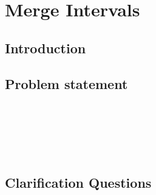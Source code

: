 %



\chapter{Merge Intervals}
\label{ch:merge_intervals_2}
\section*{Introduction}

\section{Problem statement}
\begin{exercise}
\label{example:merge_intervals_2:exercice1}

	\begin{example}
		\label{example:merge_intervals_2:example1}
		\hfill \
	}
		
	\end{example}

	\begin{example}
		\label{example:merge_intervals_2:example2}
		\hfill \
		
	\end{example}

	\begin{example}
		\hfill \
	
	\label{ex:merge_intervals_2:example3}
	\end{example}

	\begin{example}
		\hfill \

	\label{ex:merge_intervals_2:example4}	
	\end{example}
\end{exercise}

\section{Clarification Questions}

\begin{QandA}
	\item 
	\begin{answered}
		\textit{}
	\end{answered}
	
\end{QandA}

